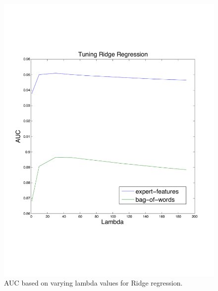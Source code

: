 \documentclass[preprint]{acm_proc_article-sp}
\begin{document}
\begin{figure}[h]
    \centering
    \includegraphics[width=\linewidth]{figures/linear-ridge.pdf}
    \caption{AUC based on varying lambda values for Ridge regression.}
    \label{fig:lambda}
\end{figure}
\end{document}
